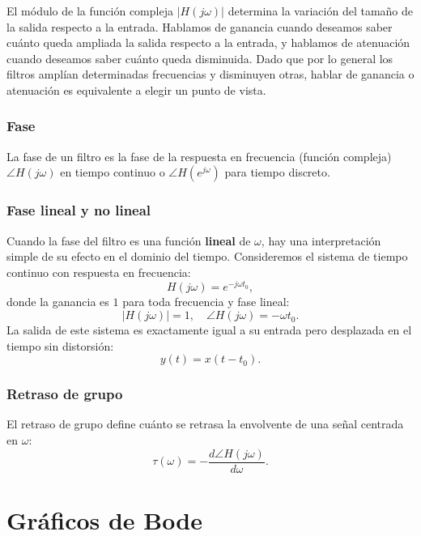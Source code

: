 El m\'{o}dulo de la funci\'{o}n compleja $|H(j\omega)|$ determina la variaci\'{o}n del tama\~{n}o de la salida respecto a la entrada. Hablamos de ganancia cuando deseamos saber cu\'{a}nto queda ampliada la salida respecto a la entrada, y hablamos de atenuaci\'{o}n cuando deseamos saber cu\'{a}nto queda disminuida. Dado que por lo general los filtros ampl\'{i}an determinadas frecuencias y disminuyen otras, hablar de ganancia o atenuaci\'{o}n es equivalente a elegir un punto de vista.

\subsubsection{Fase}
La fase de un filtro es la fase de la respuesta en frecuencia (funci\'{o}n compleja) $\angle H(j\omega)$ en tiempo continuo o $\angle H(e^{j\omega})$ para tiempo discreto.

\subsubsection{Fase lineal y no lineal}
Cuando la fase del filtro es una funci\'{o}n \textbf{lineal} de $\omega$, hay una interpretaci\'{o}n simple de su efecto en el dominio del tiempo. Consideremos el sistema de tiempo continuo con respuesta en frecuencia:
\begin{equation}
	H(j\omega) = e^{-j\omega t_{0}},
\end{equation}
donde la ganancia es $1$ para toda frecuencia y fase lineal:
\begin{equation}
	|H(j\omega)| = 1, \quad \angle H(j\omega) = -\omega t_{0}.
\end{equation}
La salida de este sistema es exactamente igual a su entrada pero desplazada en el tiempo sin distorsi\'{o}n:
\begin{equation}
	y(t) = x(t - t_{0}).
\end{equation}

\subsubsection{Retraso de grupo}
El retraso de grupo define cu\'{a}nto se retrasa la envolvente de una se\~{n}al centrada en $\omega$:
\begin{equation}
	\tau(\omega) = -\frac{d \angle H(j\omega)}{d\omega}.
\end{equation}

\section{Gr\'{a}ficos de Bode}

